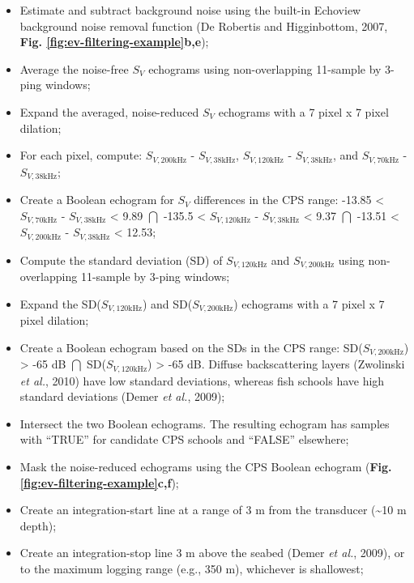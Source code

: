 \documentclass[]{article}
\providecommand{\tightlist}{%
  \setlength{\itemsep}{0pt}\setlength{\parskip}{0pt}}
\begin{document}
\begin{itemize}
\tightlist
\item
  Estimate and subtract background noise using the built-in Echoview background noise removal function (De Robertis and Higginbottom, 2007, \textbf{Fig. \ref{fig:ev-filtering-example}b,e});
\item
  Average the noise-free \(S_V\) echograms using non-overlapping 11-sample by 3-ping windows;
\item
  Expand the averaged, noise-reduced \(S_V\) echograms with a 7 pixel x 7 pixel dilation;
\item
  For each pixel, compute: \(S_{V,\mathrm{200kHz}}\) - \(S_{V,\mathrm{38kHz}}\), \(S_{V,\mathrm{120kHz}}\) - \(S_{V,\mathrm{38kHz}}\), and \(S_{V,\mathrm{70kHz}}\) - \(S_{V,\mathrm{38kHz}}\);
\item
  Create a Boolean echogram for \(S_V\) differences in the CPS range: -13.85 \textless{} \(S_{V,\mathrm{70kHz}}\) - \(S_{V,\mathrm{38kHz}}\) \textless{} 9.89 \(\bigcap\) -135.5 \textless{} \(S_{V,\mathrm{120kHz}}\) - \(S_{V,\mathrm{38kHz}}\) \textless{} 9.37 \(\bigcap\) -13.51 \textless{} \(S_{V,\mathrm{200kHz}}\) - \(S_{V,\mathrm{38kHz}}\) \textless{} 12.53;
\item
  Compute the standard deviation (SD) of \(S_{V,\mathrm{120kHz}}\) and \(S_{V,\mathrm{200kHz}}\) using non-overlapping 11-sample by 3-ping windows;
\item
  Expand the SD(\(S_{V,\mathrm{120kHz}}\)) and SD(\(S_{V,\mathrm{200kHz}}\)) echograms with a 7 pixel x 7 pixel dilation;
\item
  Create a Boolean echogram based on the SDs in the CPS range: SD(\(S_{V,\mathrm{200kHz}}\)) \textgreater{} -65 dB \(\bigcap\) SD(\(S_{V,\mathrm{120kHz}}\)) \textgreater{} -65 dB. Diffuse backscattering layers (Zwolinski \emph{et al.}, 2010) have low standard deviations, whereas fish schools have high standard deviations (Demer \emph{et al.}, 2009);
\item
  Intersect the two Boolean echograms. The resulting echogram has samples with ``TRUE'' for candidate CPS schools and ``FALSE'' elsewhere;
\item
  Mask the noise-reduced echograms using the CPS Boolean echogram (\textbf{Fig. \ref{fig:ev-filtering-example}c,f});
\item
  Create an integration-start line at a range of 3 m from the transducer (\textasciitilde10 m depth);
\item
  Create an integration-stop line 3 m above the seabed (Demer \emph{et al.}, 2009), or to the maximum logging range (e.g., 350 m), whichever is shallowest;

\end{itemize}
\end{document}
